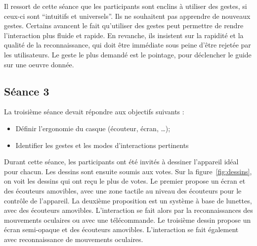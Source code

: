 Il ressort de cette séance que les participants sont enclins à utiliser des gestes, si ceux-ci sont ``intuitifs et universels''.
Ils ne souhaitent pas apprendre de nouveaux gestes. 
Certains avancent le fait qu’utiliser des gestes peut permettre de rendre l'interaction plus fluide et rapide.
En revanche, ils insistent sur la rapidité et la qualité de la reconnaissance, qui doit être immédiate sous peine d’être rejetée par les utilisateurs.
Le geste le plus demandé est le pointage, pour déclencher le guide sur une oeuvre donnée.


\subsection{Séance 3}

La troisième séance devait répondre aux objectifs suivants :
\begin{itemize}
\item Définir l’ergonomie du casque (écouteur, écran, …);
\item Identifier les gestes et les modes d’interactions pertinents
\end{itemize}

Durant cette séance, les participants ont été invités à dessiner l'appareil idéal pour chacun.
Les dessins sont ensuite soumis aux votes.
Sur la figure~\ref{fig:dessins}, on voit les dessins qui ont reçu le plus de votes.
Le premier propose un écran et des écouteurs amovibles, avec une zone tactile au niveau des écouteurs pour le contrôle de l’appareil.
La deuxième proposition est un système à base de lunettes, avec des écouteurs amovibles. L’interaction se fait alors par la reconnaissances des mouvements oculaires ou avec une télécommande.
Le troisième dessin propose un écran semi-opaque et des écouteurs amovibles. L’interaction se fait également avec reconnaissance de mouvements oculaires.

